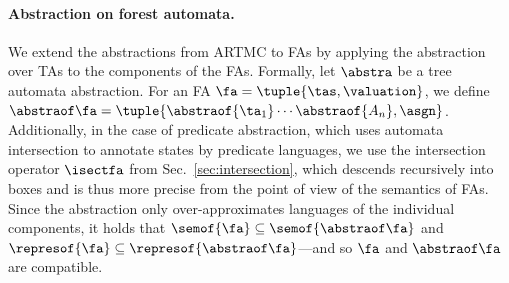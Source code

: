 {%


\paragraph{Abstraction on forest automata.}
We extend the abstractions from ARTMC to FAs by applying the abstraction over TAs to the components of the FAs.
Formally, let $\abstra$ be a tree automata abstraction.
For an FA $\fa =\tuple{\tas, \valuation}$,
we define $\abstraof \fa = \tuple{\abstraof{\ta_1}\cdots\abstraof{A_n},\asgn}$. 
%
Additionally, in the case of predicate abstraction,
which uses automata intersection to annotate states by predicate languages,
we use the intersection operator $\isectfa$ from Sec.~\ref{sec:intersection},
which descends recursively into boxes and is thus more precise from the point
of view of the semantics of FAs.
%
Since the abstraction only over-approximates languages of the individual components,
it holds that 
$\semof{\fa}\subseteq\semof{\abstraof \fa}$
and
$\represof{\fa}\subseteq\represof{\abstraof \fa }$---and so $\fa$ and $\abstraof \fa$ are compatible. 
%

}
